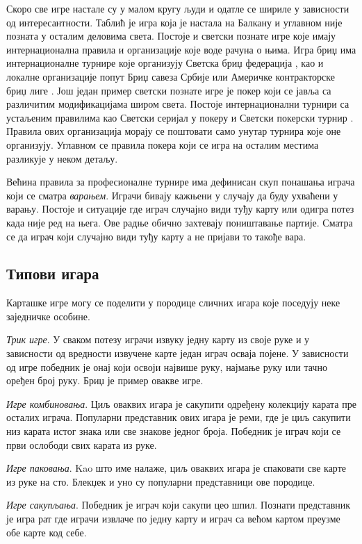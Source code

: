 \documentclass[a4paper, 12pt, ngerman]{article}
\let\oldsubsection\subsection
\renewcommand\subsection{\clearpage\oldsubsection}
\newcommand{\quotesrb}[1]{\glqq#1\grqq}
\begin{document}
Скоро све игре настале су у малом кругу људи и одатле се шириле у зависности од интересантности. Таблић је игра која је настала на Балкану и углавном није позната у осталим деловима света. Постоје и светски познате игре које имају интернационална правила и организације које воде рачуна о њима. Игра бриџ има интернационалне турнире које организују Светска бриџ федерација \cite{worldbridge}, као и локалне организације попут Бриџ савеза Србије \cite{serbianbridge} или Америчке контракторске бриџ лиге \cite{americanbridge}. Још један пример светски познате игре је покер који се јавља са различитим модификацијама широм света. Постоје интернационални турнири са устаљеним правилима као Светски серијал у покеру \cite{worldseriesofpoker} и Светски покерски турнир \cite{worldpokertour}. Правила ових организација морају се поштовати само унутар турнира које оне организују. Углавном се правила покера који се игра на осталим местима разликује у неком детаљу.

Већина правила за професионалне турнире има дефинисан скуп понашања играча који се сматра \textit{варањем}. Играчи бивају кажњени у случају да буду ухваћени у варању. Постоје и ситуације где играч случајно види туђу карту или одигра потез када није ред на њега. Ове радње обично захтевају поништавање партије. Сматра се да играч који случајно види туђу карту а не пријави то такође вара.

\subsection{Типови игара}
Карташке игре могу се поделити у породице сличних игара које поседују неке заједничке особине.

\textit{Трик игре}. У сваком потезу играчи извуку једну карту из своје руке и у зависности од вредности извучене карте један играч осваја појене. У зависности од игре победник је онај који освоји највише руку, најмање руку или тачно оређен број руку. Бриџ је пример овакве игре.

\textit{Игре комбиновања}. Циљ оваквих игара је сакупити одређену колекцију карата пре осталих играча. Популарни представник ових игара је реми, где је циљ сакупити низ карата истог знака или све знакове једног броја. Победник је играч који се први ослободи свих карата из руке.

\textit{Игре паковања}. Kao што име налаже, циљ оваквих игара је \quotesrb{спаковати} све карте из руке на сто. Блекџек и уно су популарни представници ове породице.

\textit{Игре сакупљања}. Победник је играч који сакупи цео шпил. Познати представник је игра рат где играчи извлаче по једну карту и играч са већом картом преузме обе карте код себе.
\end{document}
